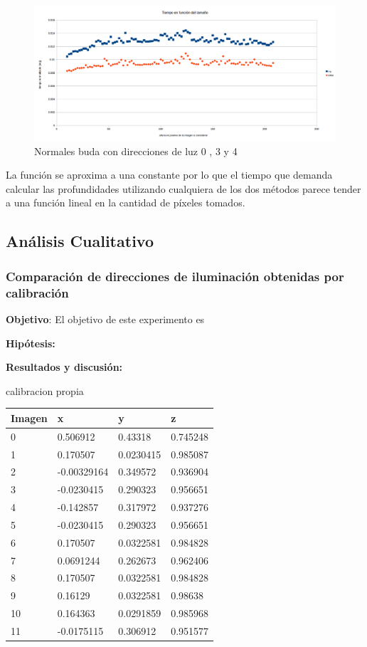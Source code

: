 \begin{figure}[H]	
	\centering
	\includegraphics[width=1\linewidth]{img/tiemposnormalizados.png}
	\caption{Normales buda con direcciones de luz 0 , 3 y 4}
    \label{fig:resultado}
\end{figure}

La función se aproxima a una constante por lo que el tiempo que demanda calcular las profundidades utilizando cualquiera de los dos métodos parece tender a una función lineal en la cantidad de píxeles tomados.

\subsection{Análisis Cualitativo}
\subsubsection{Comparación de direcciones de iluminación obtenidas por calibración}
\textbf{Objetivo}:
El objetivo de este experimento es 


\textbf{Hipótesis:}

\textbf{Resultados y discusión:}

calibracion propia
\begin{center}

    \begin{tabular}{ | l | l | l | l |}
    \hline
    Imagen & x & y & z \\ \hline
    0 & 0.506912 & 0.43318 & 0.745248 \\ \hline
    1 & 0.170507 & 0.0230415 & 0.985087 \\ \hline
    2 & -0.00329164 & 0.349572 & 0.936904 \\ \hline
    3 & -0.0230415 & 0.290323 & 0.956651 \\ \hline
    4 & -0.142857 & 0.317972 & 0.937276 \\ \hline
    5 & -0.0230415 & 0.290323 & 0.956651 \\ \hline
    6 & 0.170507 & 0.0322581 & 0.984828 \\ \hline
    7 & 0.0691244 & 0.262673 & 0.962406 \\ \hline
    8 & 0.170507 & 0.0322581 & 0.984828 \\ \hline 
    9 & 0.16129 & 0.0322581 & 0.98638 \\ \hline
    10 & 0.164363 & 0.0291859 & 0.985968 \\ \hline
    11 & -0.0175115 & 0.306912 & 0.951577 \\ \hline
    \hline
    \end{tabular}
\end{center}

